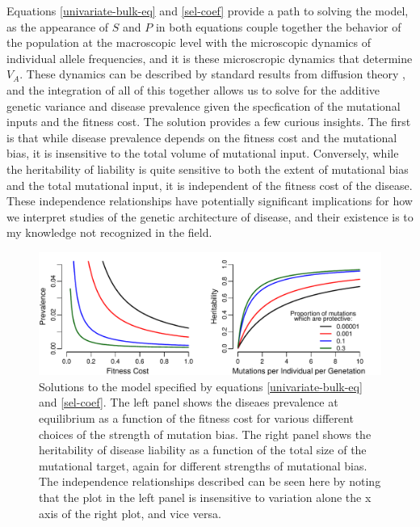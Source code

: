 \documentclass[11pt]{article}
\begin{document}
Equations \eqref{univariate-bulk-eq} and \eqref{sel-coef} provide a path to solving the model, as the appearance of $S$ and $P$ in both equations couple together the behavior of the population at the macroscopic level with the microscopic dynamics of individual allele frequencies, and it is these microscropic dynamics that determine $V_A$. These dynamics can be described by standard results from diffusion theory \cite{WrightAndFisherPapers,Sawyer:1992vb,Bustamante:2001wi,Ewens2004}, and the integration of all of this together allows us to solve for the additive genetic variance and disease prevalence given the specfication of the mutational inputs and the fitness cost. The solution provides a few curious insights. The first is that while disease prevalence depends on the fitness cost and the mutational bias, it is insensitive to the total volume of mutational input. Conversely, while the heritability of liability is quite sensitive to both the extent of mutational bias and the total mutational input, it is independent of the fitness cost of the disease. These independence relationships have potentially significant implications for how we interpret studies of the genetic architecture of disease, and their existence is to my knowledge not recognized in the field. 


  \begin{figure}
    \includegraphics[width=\textwidth]{../figures/SimpleModelSolutions.pdf}
    \caption{Solutions to the model specified by equations \eqref{univariate-bulk-eq} and \eqref{sel-coef}. The left panel shows the diseaes prevalence at equilibrium as a function of the fitness cost for various different choices of the strength of mutation bias. The right panel shows the heritability of disease liability as a function of the total size of the mutational target, again for different strengths of mutational bias. The independence relationships described can be seen here by noting that the plot in the left panel is insensitive to variation alone the x axis of the right plot, and vice versa.}
    \label{simple-model-solve}
  \end{figure}
  
\end{document}
